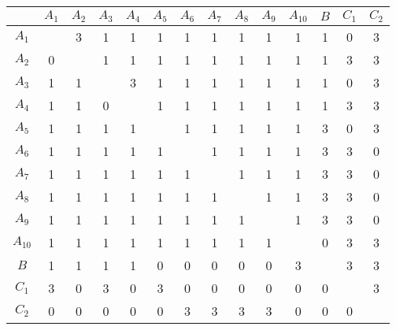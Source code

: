 \begin{tabular}{|c|c|c|c|c|c|c|c|c|c|c|c|c|c|}
\hline & $A_1$ & $A_2$ & $A_3$ & $A_4$ & $A_5$ & $A_6$ & $A_7$ & $A_8$ & $A_9$ & $A_{10}$ & $B$ & $C_1$ & $C_2$ \\
\hline$A_1$ & & 3 & 1 & 1 & 1 & 1 & 1 & 1 & 1 & 1 & 1 & 0 & 3 \\
\hline$A_2$ & 0 & & 1 & 1 & 1 & 1 & 1 & 1 & 1 & 1 & 1 & 3 & 3 \\
\hline$A_3$ & 1 & 1 & & 3 & 1 & 1 & 1 & 1 & 1 & 1 & 1 & 0 & 3 \\
\hline$A_4$ & 1 & 1 & 0 & & 1 & 1 & 1 & 1 & 1 & 1 & 1 & 3 & 3 \\
\hline$A_5$ & 1 & 1 & 1 & 1 & & 1 & 1 & 1 & 1 & 1 & 3 & 0 & 3 \\
\hline$A_6$ & 1 & 1 & 1 & 1 & 1 & & 1 & 1 & 1 & 1 & 3 & 3 & 0 \\
\hline$A_7$ & 1 & 1 & 1 & 1 & 1 & 1 & & 1 & 1 & 1 & 3 & 3 & 0 \\
\hline$A_8$ & 1 & 1 & 1 & 1 & 1 & 1 & 1 & & 1 & 1 & 3 & 3 & 0 \\
\hline$A_9$ & 1 & 1 & 1 & 1 & 1 & 1 & 1 & 1 & & 1 & 3 & 3 & 0 \\
\hline$A_{10}$ & 1 & 1 & 1 & 1 & 1 & 1 & 1 & 1 & 1 & & 0 & 3 & 3 \\
\hline$B$ & 1 & 1 & 1 & 1 & 0 & 0 & 0 & 0 & 0 & 3 & & 3 & 3 \\
\hline$C_1$ & 3 & 0 & 3 & 0 & 3 & 0 & 0 & 0 & 0 & 0 & 0 & & 3 \\
\hline$C_2$ & 0 & 0 & 0 & 0 & 0 & 3 & 3 & 3 & 3 & 0 & 0 & 0 & \\
\hline
\end{tabular}



